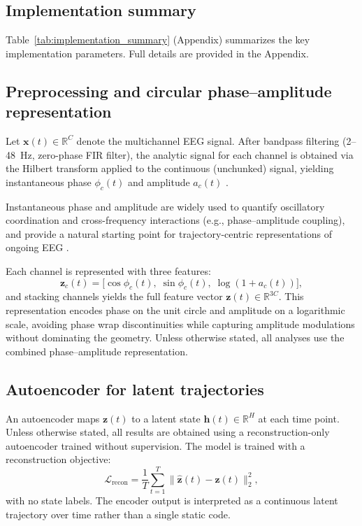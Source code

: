 \documentclass[5p,twocolumn,authoryear]{elsarticle}
\begin{document}
\subsection{Implementation summary}
\label{sec:impl_summary}

Table~\ref{tab:implementation_summary} (Appendix) summarizes the key implementation parameters. Full details are provided in the Appendix.

\subsection{Preprocessing and circular phase--amplitude representation}

Let $\mathbf{x}(t) \in \mathbb{R}^{C}$ denote the multichannel EEG signal. After bandpass filtering (2--48~Hz, zero-phase FIR filter), the analytic signal for each channel is obtained via the Hilbert transform applied to the continuous (unchunked) signal, yielding instantaneous phase $\phi_c(t)$ and amplitude $a_c(t)$ \citep{Boashash1992}.

Instantaneous phase and amplitude are widely used to quantify oscillatory coordination and cross-frequency interactions (e.g., phase--amplitude coupling), and provide a natural starting point for trajectory-centric representations of ongoing EEG \citep{Canolty2006,Tort2010}.

Each channel is represented with three features:
\begin{equation}
\mathbf{z}_c(t) = \big[\cos\phi_c(t),\; \sin\phi_c(t),\; \log(1 + a_c(t))\big],
\end{equation}
and stacking channels yields the full feature vector $\mathbf{z}(t) \in \mathbb{R}^{3C}$. This representation encodes phase on the unit circle and amplitude on a logarithmic scale, avoiding phase wrap discontinuities while capturing amplitude modulations without dominating the geometry. Unless otherwise stated, all analyses use the combined phase--amplitude representation.

\subsection{Autoencoder for latent trajectories}

An autoencoder maps $\mathbf{z}(t)$ to a latent state $\mathbf{h}(t) \in \mathbb{R}^{H}$ at each time point. Unless otherwise stated, all results are obtained using a reconstruction-only autoencoder trained without supervision. The model is trained with a reconstruction objective:
\begin{equation}
\mathcal{L}_{\mathrm{recon}} = \frac{1}{T}\sum_{t=1}^{T}\|\hat{\mathbf{z}}(t) - \mathbf{z}(t)\|_2^2,
\end{equation}
with no state labels. The encoder output is interpreted as a continuous latent trajectory over time rather than a single static code.
\end{document}
